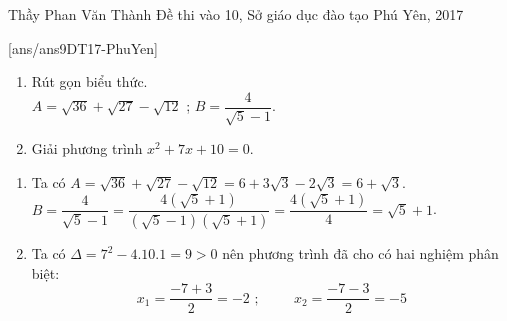 
\begin{name}
{Thầy  Phan Văn Thành}
{Đề thi vào 10, Sở giáo dục đào tạo Phú Yên, 2017}
\end{name}
\setcounter{ex}{0}
[ans/ans9DT17-PhuYen]
\begin{ex}%
    \hfill
    \begin{enumerate}
        \item Rút gọn biểu thức.\\
        $A = \sqrt{36} + \sqrt{27} - \sqrt{12}$\,\,; \hspace{1cm} $B = \dfrac{4}{\sqrt{5} - 1}$.
        \item Giải phương trình $x^2 + 7x + 10 = 0$.
    \end{enumerate}
\loigiai
    {
    \begin{enumerate}
        \item Ta có $A = \sqrt{36} + \sqrt{27} - \sqrt{12} = 6 + 3\sqrt{3} - 2\sqrt{3} = 6 + \sqrt{3}$.\\
        $B = \dfrac{4}{\sqrt{5} - 1} = \dfrac{4(\sqrt{5} + 1)}{(\sqrt{5} - 1)(\sqrt{5} + 1)} = \dfrac{4(\sqrt{5} + 1)}{4} = \sqrt{5} + 1$.
        \item Ta có $\Delta = 7^2 - 4.10.1 = 9 > 0$ nên phương trình đã cho có hai nghiệm phân biệt:
        $$x_1 = \dfrac{-7 + 3}{2} = -2 \,\,; \hspace{1cm} x_2 = \dfrac{-7 - 3}{2} = -5$$
    \end{enumerate}
    }
\end{ex}

